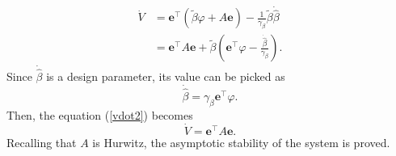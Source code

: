 \begin{align}
\dot{V}&=\mathbf{e}^\top(\tilde{\beta}\varphi+A\mathbf{e})-\frac{1}{\gamma_\beta}\tilde{\beta}\dot{\hat{\beta}}
\\&=\mathbf{e}^\top A\mathbf{e}+\tilde{\beta}(\mathbf{e}^\top\varphi-\frac{\dot{\hat{\beta}}}{\gamma_\beta}).
\end{align}
Since $\dot{\hat{\beta}}$ is a design parameter, its value can be picked as 
\begin{equation}
\dot{\hat{\beta}}=\gamma_\beta\mathbf{e}^\top\varphi.
\end{equation}
Then, the equation (\ref{vdot2}) becomes
\begin{equation}
\dot{V}=\mathbf{e}^\top A\mathbf{e}.
\end{equation}
Recalling that $A$ is Hurwitz, the asymptotic stability of the system is proved.
